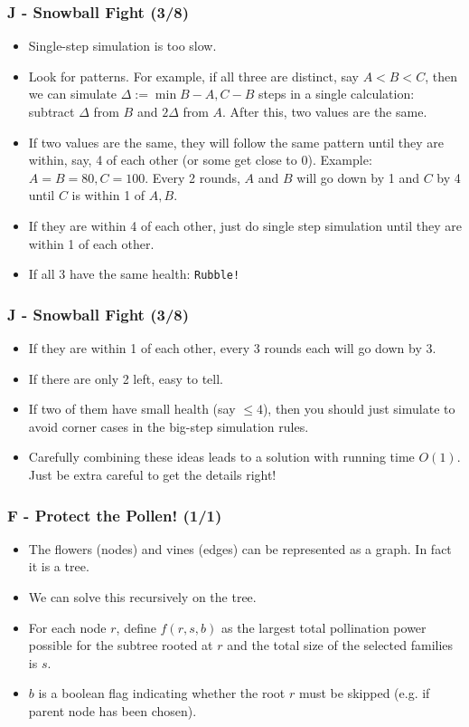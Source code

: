 \documentclass{beamer}
\begin{document}
\begin{frame}
\frametitle{J - Snowball Fight (3/8)}
\begin{itemize}
\setlength\itemsep{0.5\baselineskip}
\item Single-step simulation is too slow.
\item Look for patterns. For example, if all three are distinct, say $A < B < C$, then we can simulate $\Delta := \min{B-A, C-B}$ steps in a single calculation: subtract $\Delta$ from $B$ and $2\Delta$ from $A$. After this, two values are the same.
\item If two values are the same, they will follow the same pattern until they are within, say, 4 of each other (or some get close to 0). Example: $A = B = 80, C = 100$. Every 2 rounds, $A$ and $B$ will go down by 1 and $C$ by 4 until $C$ is within 1 of $A,B$. \item If they are within 4 of each other, just do single step simulation until they are within 1 of each other.
\item If all 3 have the same health: \texttt{Rubble!}
\end{itemize}
\end{frame}

\begin{frame}
\frametitle{J - Snowball Fight (3/8)}
\begin{itemize}
\setlength\itemsep{0.5\baselineskip}
\item If they are within 1 of each other, every 3 rounds each will go down by 3.
\item If there are only 2 left, easy to tell.
\item If two of them have small health (say $\leq 4$), then you should just simulate to avoid corner cases in the big-step simulation rules.
\item Carefully combining these ideas leads to a solution with running time $O(1)$. Just be extra careful to get the details right!
\end{itemize}
\end{frame}


\begin{frame}
\frametitle{F - Protect the Pollen! (1/1)}
\begin{itemize}
  \setlength\itemsep{0.5\baselineskip}
\item The flowers (nodes) and vines (edges) can be represented as a graph.
  In fact it is a tree.
\item We can solve this recursively on the tree.
\item For each node $r$, define $f(r,s,b)$ as the largest total
  pollination power possible for the subtree rooted at $r$ and the total
  size of the selected families is $s$.
\item $b$ is a boolean flag indicating whether the root $r$ must be skipped
  (e.g. if parent node has been chosen).
\end{itemize}
\end{frame}
\end{document}
